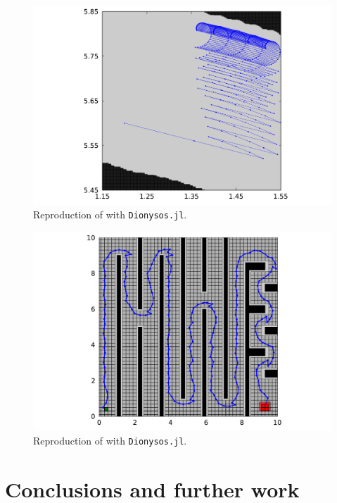 \documentclass{juliacon}
\begin{document}
\begin{figure}[ht!]
    \centerline{\includegraphics[width=\linewidth, trim=90 0 85 0, clip]{Figures/Benchmarking/dcdc.pdf}}
    \caption{Reproduction of \cite[Figure 4]{rungger2016scots} with \texttt{Dionysos.jl}.}
    \label{fig:dcdc}
\end{figure}
\begin{figure}[ht!]
    \centerline{\includegraphics[width=\linewidth, trim=90 0 85 0, clip]{Figures/Benchmarking/vehicle.pdf}}
    \caption{Reproduction of \cite[Figure 3]{rungger2016scots} with \texttt{Dionysos.jl}.}
    \label{fig:vehicle}
\end{figure}
 
\section{Conclusions and further work}
\end{document}
